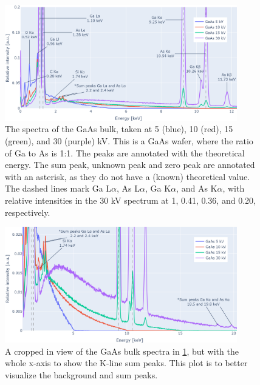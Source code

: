 \begin{figure}[p] %
    \centering
    \includegraphics[width=0.90\textwidth]{figures/each_spectra/GaAs_everything.png}
    \caption{
        The spectra of the GaAs bulk, taken at 5 (blue), 10 (red), 15 (green), and 30 (purple) kV.
        This is a GaAs wafer, where the ratio of Ga to As is 1:1.
        The peaks are annotated with the theoretical energy.
        The sum peak, unknown peak and zero peak are annotated with an asterisk, as they do not have a (known) theoretical value.
        The dashed lines mark Ga L$\alpha$, As L$\alpha$, Ga K$\alpha$, and As K$\alpha$, with relative intensities in the 30 kV spectrum at 1, 0.41, 0.36, and 0.20, respectively.
    }
    \label{fig:results:Spectra_GaAs}
\end{figure}


\begin{figure}[p]
    \centering
    \includegraphics[width=0.90\textwidth]{figures/each_spectra/GaAs_bg_and_sum_peaks.png}
    \caption{
        A cropped in view of the GaAs bulk spectra in \cref{fig:results:Spectra_GaAs}, but with the whole x-axis to show the K-line sum peaks.
        This plot is to better visualize the background and sum peaks.
    }
    \label{fig:results:Spectra_GaAs_bg_and_sum_peaks}
\end{figure}


